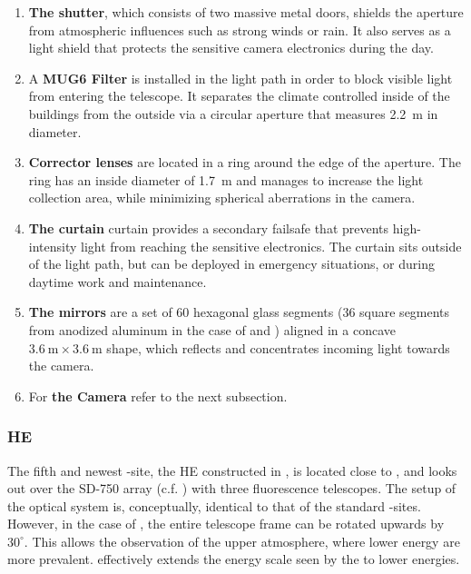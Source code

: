 \begin{enumerate}[label=(\Alph*)]
  \item \textbf{The shutter}, which consists of two massive metal doors, shields  the aperture from atmospheric influences such as strong winds or rain. It also  serves as a light shield that protects the sensitive camera electronics during  the day.

  \item A \textbf{MUG6 \UV Filter} is installed in the light path in order to 
  block visible light from entering the telescope. It separates the climate 
  controlled inside of the \FD buildings from the outside via a circular
  aperture that measures \SI{2.2}{\meter} in diameter. 
  
  \item \textbf{Corrector lenses} are located in a ring around the edge of the 
  aperture. The ring has an inside diameter of \SI{1.7}{\meter} and manages to 
  increase the light collection area, while minimizing spherical aberrations in 
  the camera.

  \item \textbf{The curtain} curtain provides a secondary failsafe that prevents
  high-intensity light from reaching the sensitive electronics. The curtain 
  sits outside of the light path, but can be deployed in emergency situations, 
  or during daytime work and maintenance.

  \item \textbf{The mirrors} are a set of 60 hexagonal glass segments (36 square  segments from anodized aluminum in the case of \LL and \LM) aligned in a 
  concave $\SI{3.6}{\meter}\times\SI{3.6}{\meter}$ shape, which reflects and 
  concentrates incoming light towards the camera.

  \item For \textbf{the Camera} refer to the next subsection.
\end{enumerate}

\subsubsection{\acf{HE}}
\label{sssec:HEAT}

The fifth and newest \FD-site, the \acl{HE} constructed in , is located close to \CO, and looks 
out over the SD-750 array (c.f. ) with three fluorescence 
telescopes. The setup of the optical system is, conceptually, identical to that
of the standard \FD-sites. However, in the case of \HE, the entire telescope frame can be rotated upwards by $30^\circ$. This allows the observation of the 
upper atmosphere, where lower energy \EASs are more prevalent. \HE effectively 
extends the energy scale seen by the \FD to lower energies.

